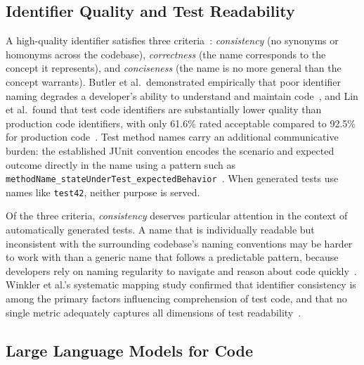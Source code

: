 \documentclass[conference]{IEEEtran}
\begin{document}
\subsection{Identifier Quality and Test Readability}

A high-quality identifier satisfies three
criteria~\cite{dekeersmaeker2024enhancing}: \emph{consistency} (no synonyms or
homonyms across the codebase), \emph{correctness} (the name corresponds to the
concept it represents), and \emph{conciseness} (the name is no more general
than the concept warrants).
Butler et al.\ demonstrated empirically that poor identifier naming degrades a
developer's ability to understand and maintain
code~\cite{butler2010exploring}, and Lin et al.\ found that test code
identifiers are substantially lower quality than production code identifiers,
with only 61.6\% rated acceptable compared to 92.5\% for production
code~\cite{lin2019quality}.
Test method names carry an additional communicative burden: the established
JUnit convention encodes the scenario and expected outcome directly in the name
using a pattern such as
\texttt{methodName\_stateUnderTest\_expectedBehavior}~\cite{daka2017generating}.
When generated tests use names like \texttt{test42}, neither purpose is served.

Of the three criteria, \emph{consistency} deserves particular attention in the
context of automatically generated tests.
A name that is individually readable but inconsistent with the surrounding
codebase's naming conventions may be harder to work with than a generic name
that follows a predictable pattern, because developers rely on naming
regularity to navigate and reason about code
quickly~\cite{lin2017consistency,butler2010exploring}.
Winkler et al.'s systematic mapping study confirmed that identifier consistency
is among the primary factors influencing comprehension of test code, and that
no single metric adequately captures all dimensions of test
readability~\cite{winkler2024investigating}.

\subsection{Large Language Models for Code}
\end{document}
